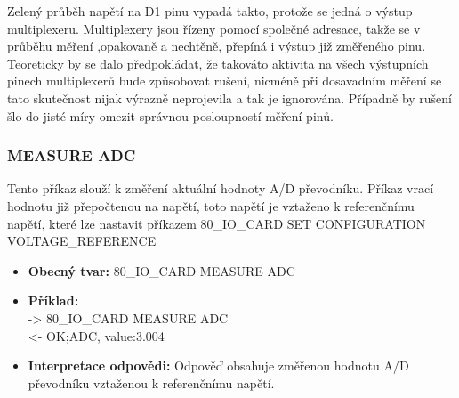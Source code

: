 Zelený průběh napětí na D1 pinu vypadá takto, protože se jedná o výstup multiplexeru. Multiplexery jsou řízeny pomocí společné adresace, takže
se v průběhu měření ,opakovaně a nechtěně, přepíná i výstup již změřeného pinu. Teoreticky by se dalo předpokládat, že takováto aktivita na všech
výstupních pinech multiplexerů bude způsobovat rušení, nicméně při dosavadním měření se tato skutečnost nijak výrazně neprojevila a tak je ignorována.
Případně by rušení šlo do jisté míry omezit správnou posloupností měření pinů.

\subsubsection{MEASURE ADC}
Tento příkaz slouží k změření aktuální hodnoty A/D převodníku. Příkaz vrací hodnotu již přepočtenou na napětí, toto napětí je vztaženo k referenčnímu napětí,
které lze nastavit příkazem 80\_IO\_CARD SET CONFIGURATION VOLTAGE\_REFERENCE

\begin{itemize}[leftmargin=*]
    \item \textbf{Obecný tvar:} 80\_IO\_CARD MEASURE ADC
    \item \textbf{Příklad:}\\
    -> 80\_IO\_CARD MEASURE ADC\\
    <- OK;ADC, value:3.004\\
    \item \textbf{Interpretace odpovědi:} Odpověď obsahuje změřenou hodnotu A/D převodníku vztaženou k referenčnímu napětí.
\end{itemize}